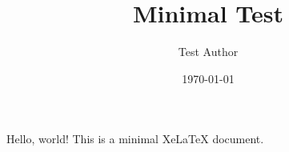 \documentclass{article}
\title{Minimal Test}
\author{Test Author}
\date{\today}
\begin{document}
\maketitle
Hello, world! This is a minimal XeLaTeX document.
\end{document}
